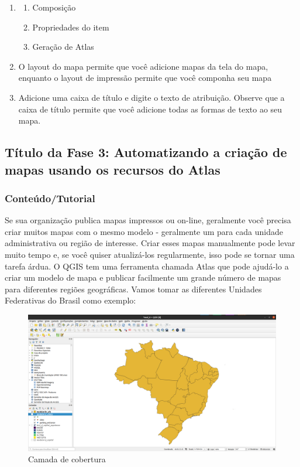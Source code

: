 \documentclass[
]{book}
\providecommand{\tightlist}{%
  \setlength{\itemsep}{0pt}\setlength{\parskip}{0pt}}
\begin{document}
\begin{enumerate}
\def\labelenumi{\arabic{enumi}.}
\item
  \begin{enumerate}
  \def\labelenumii{\alph{enumii}.}
  \tightlist
  \item
    Composição
  \item
    Propriedades do item
  \item
    Geração de Atlas
  \end{enumerate}
\item
  O layout do mapa permite que você adicione mapas da tela do mapa, enquanto o layout de impressão permite que você componha seu mapa
\item
  Adicione uma caixa de título e digite o texto de atribuição. Observe que a caixa de título permite que você adicione todas as formas de texto ao seu mapa.
\end{enumerate}

\hypertarget{tuxedtulo-da-fase-3-automatizando-a-criauxe7uxe3o-de-mapas-usando-os-recursos-do-atlas}{%
\subsection{Título da Fase 3: Automatizando a criação de mapas usando os recursos do Atlas}\label{tuxedtulo-da-fase-3-automatizando-a-criauxe7uxe3o-de-mapas-usando-os-recursos-do-atlas}}

\hypertarget{conteuxfadotutorial-1}{%
\subsubsection{\texorpdfstring{\textbf{Conteúdo/Tutorial}}{Conteúdo/Tutorial}}\label{conteuxfadotutorial-1}}

Se sua organização publica mapas impressos ou on-line, geralmente você precisa criar muitos mapas com o mesmo modelo - geralmente um para cada unidade administrativa ou região de interesse. Criar esses mapas manualmente pode levar muito tempo e, se você quiser atualizá-los regularmente, isso pode se tornar uma tarefa árdua. O QGIS tem uma ferramenta chamada Atlas que pode ajudá-lo a criar um modelo de mapa e publicar facilmente um grande número de mapas para diferentes regiões geográficas. Vamos tomar as diferentes Unidades Federativas do Brasil como exemplo:

\begin{figure}
\centering
\includegraphics{media/modulo5/atlas-coverage.png}
\caption{Camada de cobertura}
\end{figure}
\end{document}

